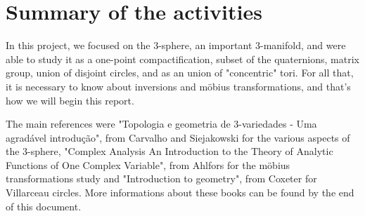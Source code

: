 \chapter{Summary of the activities}\label{chp:resumoAtiv}

In this project, we focused on the 3-sphere, an important 3-manifold, and were able to study it as a one-point compactification, subset of the quaternions, matrix group, union of disjoint circles, and as an union of "concentric" tori. For all that, it is necessary to know about inversions and möbius transformations, and that's how we will begin this report.

The main references were \cite{Andre}"Topologia e geometria de 3-variedades - Uma agradável introdução", from Carvalho and Siejakowski for the various aspects of the 3-sphere, \cite{Ahlfors} "Complex Analysis An Introduction to the Theory of Analytic Functions of One Complex Variable", from Ahlfors for the möbius transformations study and \cite{Coxeter} "Introduction to geometry", from Coxeter for Villarceau circles. More informations about these books can be found by the end of this document.
